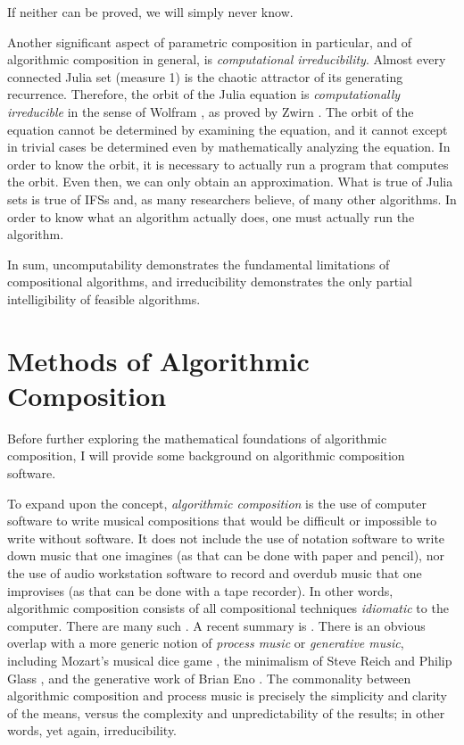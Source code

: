 \documentclass[11pt,papersize=a4]{scrartcl}
\begin{document}
If neither can be proved, we will simply never know.

Another significant aspect of parametric composition in particular, and of algorithmic composition in general, is \emph{computational irreducibility}. Almost every connected Julia set (measure 1) is the chaotic attractor of its generating recurrence. Therefore, the orbit of the Julia equation is \emph{computationally irreducible} in the sense of Wolfram \parencite{wolfram1985undecidability}, as proved by Zwirn \parencite{zwirn2015computational}. The orbit of the equation cannot be determined by examining the equation, and it cannot except in trivial cases be determined even by mathematically analyzing the equation. In order to know the orbit, it is necessary to actually run a program that computes the orbit. Even then, we can only obtain an approximation. What is true of Julia sets is true of IFSs and, as many researchers believe, of many other algorithms. In order to know what an algorithm actually does, one must actually run the algorithm.

In sum, uncomputability demonstrates the fundamental limitations of compositional algorithms, and irreducibility demonstrates the only partial intelligibility of feasible algorithms.

\section*{Methods of Algorithmic Composition}

Before further exploring the mathematical foundations of algorithmic composition, I will provide some background on algorithmic composition software.

To expand upon the concept, \emph{algorithmic composition} is the use of computer software to write musical compositions that would be difficult or impossible to write without software. It does not include the use of notation software to write down music that one imagines (as that can be done with paper and pencil), nor the use of audio workstation software to record and overdub music that one improvises (as that can be done with a tape recorder). In other words, algorithmic composition consists of all compositional techniques \emph{idiomatic} to the computer. There are many such \parencite{fernandez2013ai, arizanet}. A recent summary is \parencite{mclean2018oxford}. There is an obvious overlap with a more generic notion of \emph{process music} or \emph{generative music}, including Mozart's musical dice game \parencite{humdrumdice}, the minimalism of Steve Reich \parencite{reichprocess, 10.2307/832600} and Philip Glass \parencite{potter2002four, glass2015words}, and the generative work of Brian Eno \parencite{eno1996generative}. The commonality between algorithmic composition and process music is precisely the simplicity and clarity of the means, versus the complexity and unpredictability of the results; in other words, yet again, irreducibility. 
\end{document}
